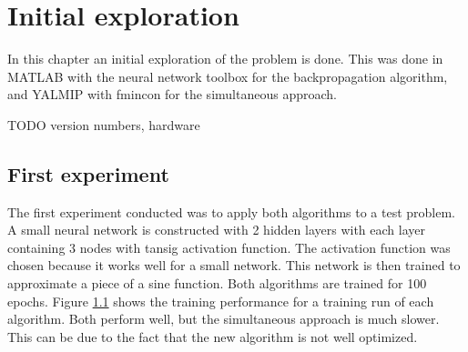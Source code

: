 
\chapter{Initial exploration}
\label{cha:1}
In this chapter an initial exploration of the problem is done. This was done in MATLAB with the neural network toolbox for the backpropagation algorithm, and YALMIP with fmincon for the simultaneous approach.

TODO version numbers, hardware

\section{First experiment}
The first experiment conducted was to apply both algorithms to a test problem. A small neural network is constructed with 2 hidden layers with each layer containing 3 nodes with tansig activation function. The activation function was chosen because it works well for a small network. This network is then trained to approximate a piece of a sine function. Both algorithms are trained for 100 epochs. Figure \ref{} shows the training performance for a training run of each algorithm. Both perform well, but the simultaneous approach is much slower. This can be due to the fact that the new algorithm is not well optimized.

